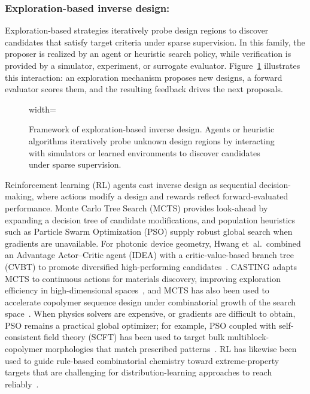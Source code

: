 \subsubsection{Exploration-based inverse design:}

Exploration-based strategies iteratively probe design regions to discover candidates that satisfy target criteria under sparse supervision. In this family, the proposer is realized by an agent or heuristic search policy, while verification is provided by a simulator, experiment, or surrogate evaluator. Figure~\ref{fig:exploration_based_inverse} illustrates this interaction: an exploration mechanism proposes new designs, a forward evaluator scores them, and the resulting feedback drives the next proposals.

\begin{figure}[!htbp]
  \centering
  \begin{adjustbox}{width=\linewidth}
      
  \end{adjustbox}
  \caption[Exploration-Based Inverse Design Framework]{Framework of exploration-based inverse design. Agents or heuristic algorithms iteratively probe unknown design regions by interacting with simulators or learned environments to discover candidates under sparse supervision.}
  \label{fig:exploration_based_inverse}
\end{figure}

Reinforcement learning (RL) agents cast inverse design as sequential decision-making, where actions modify a design and rewards reflect forward-evaluated performance. Monte Carlo Tree Search (MCTS) provides look-ahead by expanding a decision tree of candidate modifications, and population heuristics such as Particle Swarm Optimization (PSO) supply robust global search when gradients are unavailable. For photonic device geometry, Hwang et~al.\ combined an Advantage Actor--Critic agent (IDEA) with a critic-value-based branch tree (CVBT) to promote diversified high-performing candidates~\cite{Hwang2022_ASOC}. CASTING adapts MCTS to continuous actions for materials discovery, improving exploration efficiency in high-dimensional spaces~\cite{Banik2023_NPJCM}, and MCTS has also been used to accelerate copolymer sequence design under combinatorial growth of the search space~\cite{Patra2020_Nanoscale}. When physics solvers are expensive, or gradients are difficult to obtain, PSO remains a practical global optimizer; for example, PSO coupled with self-consistent field theory (SCFT) has been used to target bulk multiblock-copolymer morphologies that match prescribed patterns~\cite{Khadilkar2017_Macromolecules, Wang2018_SoftComput}. RL has likewise been used to guide rule-based combinatorial chemistry toward extreme-property targets that are challenging for distribution-learning approaches to reach reliably~\cite{Kim2024_ChemSci}.

